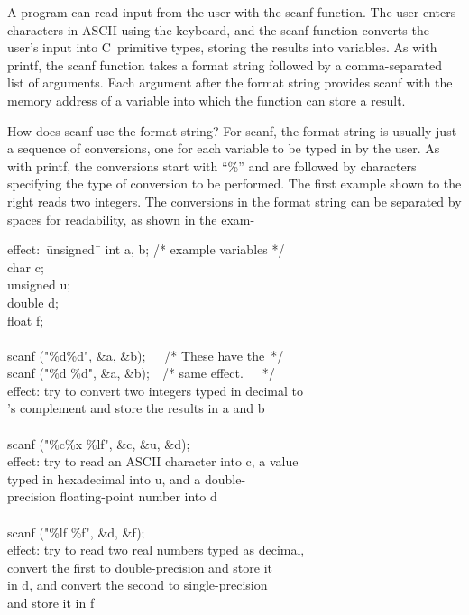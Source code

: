 \begin{minipage}{2.75in}
A program can read input from the user with the {\tfix scanf} function.
The user enters characters in ASCII using the keyboard, and the
{\tfix scanf} function converts the user's input into C~primitive types,
storing the results into variables.  As with {\tfix printf}, the
{\tfix scanf} function takes a format string followed by a comma-separated
list of arguments.  Each argument after the format string provides
{\tfix scanf} with the memory address of a variable into which the
function can store a result.\mpline

How does {\tfix scanf} use the format string?
%
For {\tfix scanf}, the format string is usually just a sequence
of conversions, one for each variable to be typed in by the user.
As with {\tfix printf}, the conversions start with ``\%'' and
are followed by characters specifying the type of conversion
to be performed.  The first example shown to the right reads
two integers.
%
The conversions in the format string can be separated by spaces 
for readability, as shown in the exam-\linebreak\mpdone
\end{minipage}\hspace{0.25in}%
\begin{minipage}{3.5in}
\begin{tabbing}
effect:~\=unsigned~\=\kill
\> {\fix int     } \> {\fix a, b;  /* example variables */}\\
\> {\fix char    } \> {\fix c;}\\
\> {\fix unsigned} \> {\fix u;}\\
\> {\fix double  } \> {\fix d;}\\
\> {\fix float   } \> {\fix f;}\\
\\
\> {\fix scanf ("\%d\%d", \&a, \&b);~~~/* These have the~*/}\\
\> {\fix scanf ("\%d \%d", \&a, \&b);~~/* same effect.~~~*/}\\
effect: \> try to convert two integers typed in decimal to\\
's complement and store the results in {\fix a} and {\fix b}\\
\\
\> {\fix scanf ("\%c\%x \%lf", \&c, \&u, \&d);}\\
effect: \> try to read an ASCII character into {\fix c}, a value\\
\> typed in hexadecimal into {\fix u}, and a double-\\
\> precision \> floating-point number into {\fix d}\\
\\
\> {\fix scanf ("\%lf \%f", \&d, \&f);}\\
effect: \> try to read two real numbers typed as decimal,\\
\> convert the first to double-precision and store it \\
\> in {\fix d}, and convert the second to single-precision \\
\> and store it in {\fix f}
\end{tabbing}
\end{minipage}

